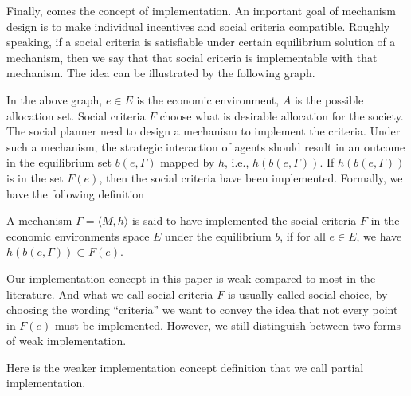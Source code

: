 Finally, comes the concept of implementation. An important goal of
mechanism design is to make individual incentives and social criteria
compatible.  Roughly speaking, if a social criteria is satisfiable under certain
equilibrium solution of a mechanism, then we say that that social
criteria is implementable with that mechanism.
The idea can be illustrated by the following graph.

\begin{center}

\end{center}

In the above graph, $e \in E$ is the economic environment, $A$ is the
possible allocation set. Social criteria $F$ choose what is desirable
allocation for the society. The social planner need to design a
mechanism to implement the criteria. Under such a mechanism,  the
strategic interaction of agents should result in an outcome in the
equilibrium set $b(e, \Gamma)$ mapped by $h$, i.e.,
$h(b(e,\Gamma))$. If $h(b(e,\Gamma))$ is in the set $F(e)$,  then the
social criteria have been implemented. Formally, we have the following
definition

\begin{definition}
A mechanism $\Gamma=\langle M,h\rangle$ is said to have implemented the social
criteria $F$ in the economic environments space $E$ under the
equilibrium $b$, if for all $e \in E$, we have $h(b(e,\Gamma)) \subset F(e)$.
\end{definition}

Our implementation concept in this paper is weak compared to most in
the literature.  And what we call social criteria $F$ is usually
called social choice, by choosing the wording ``criteria''  we want to convey the idea that not
every  point  in $F(e)$ must be implemented.  However, we still
distinguish between two forms of weak implementation. 

Here is the weaker implementation concept definition that we call
partial 
implementation.

